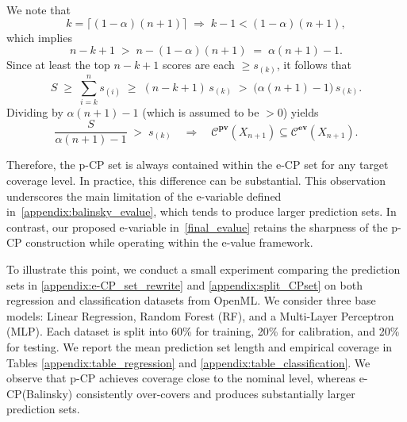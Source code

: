 \documentclass{article}
\theoremstyle{plain}
\theoremstyle{definition}
\theoremstyle{remark}
\begin{document}
We note that
\[
k=\lceil (1-\alpha)(n+1)\rceil \;\Rightarrow\; k-1 < (1-\alpha)(n+1),
\]
which implies
\[
n-k+1 \;>\; n-(1-\alpha)(n+1) \;=\; \alpha(n+1)-1.
\]
Since at least the top \(n-k+1\) scores are each \(\ge s_{(k)}\), it follows that
\[
S \;\ge\; \sum_{i=k}^n s_{(i)} \;\ge\; (n-k+1)\,s_{(k)}
\;>\; \bigl(\alpha(n+1)-1\bigr)\,s_{(k)}.
\]
Dividing by \(\alpha(n+1)-1\) (which is assumed to be $>0$) yields
\[
\frac{S}{\alpha(n+1)-1} \;>\; s_{(k)} \quad  \Longrightarrow\quad
\mathcal{C}^{\mathbf{pv}}(X_{n+1})\subseteq \mathcal{C}^{\mathbf{ev}}(X_{n+1}).
\]

Therefore, the p-CP set is always contained within the e-CP set for any target coverage level. In practice, this difference can be substantial. This observation underscores the main limitation of the e-variable defined in~\eqref{appendix:balinsky_evalue}, which tends to produce larger prediction sets. In contrast, our proposed e-variable in~\eqref{final_evalue} retains the sharpness of the p-CP construction while operating within the e-value framework.




To illustrate this point, we conduct a small experiment comparing the prediction sets in \eqref{appendix:e-CP_set_rewrite} and \eqref{appendix:split_CPset} on both regression and classification datasets from OpenML. We consider three base models: Linear Regression, Random Forest (RF), and a Multi-Layer Perceptron (MLP). Each dataset is split into 60\% for training, 20\% for calibration, and 20\% for testing. We report the mean prediction set length and empirical coverage in Tables \ref{appendix:table_regression} and \ref{appendix:table_classification}. We observe that p-CP achieves coverage close to the nominal level, whereas e-CP(Balinsky) consistently over-covers and produces substantially larger prediction sets.
\end{document}
